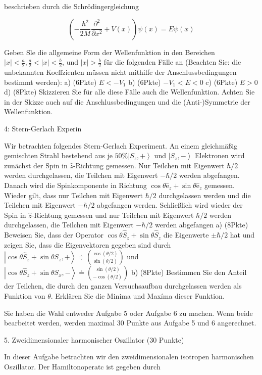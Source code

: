 \documentclass[11pt,a4paper]{article}
\begin{document}
beschrieben durch die Schrödingergleichung

$$
\left(-\frac{\hbar^2}{2 M} \frac{\partial^2}{\partial x^2}+V(x)\right) \psi(x)=E \psi(x)
$$


Geben Sle die allgemeine Form der Wellenfunktion in den Bereichen $|x|<\frac{a}{2}, \frac{a}{2}<|x|<\frac{b}{2}$, und $|x|>\frac{b}{2}$ für die folgenden Fälle an (Beachten Sie: die unbekannten Koeffzienten müssen nicht mithilfe der Anschlussbedingungen bestimmt werden):
a) (6Pkte) $E<-V_1$
b) (6Pkte) $-V_1<E<0$
c) (6Pkte) $E>0$
d) (8Pkte) Skizzieren Sie für alle diese Fälle auch die Wellenfunktion. Achten Sie in der Skizze auch auf die Anschlussbedingungen und die (Anti-)Symmetrie der Wellenfunktion.


4: Stern-Gerlach Experin

Wir betrachten folgendes Stern-Gerlach Experiment. An einem gleichmäßig gemischten Strahl bestehend aus je $50 \%\left|S_z,+\right\rangle$ und $\left|S_z,-\right\rangle$ Elektronen wird zunächst der Spin in $\hat{z}$-Richtung gemessen. Nur Teilchen mit Eigenwert $\hbar / 2$ werden durchgelassen, die Teilchen mit Eigenwert $-\hbar / 2$ werden abgefangen. Danach wird die Spinkomponente in Richtung $\cos \theta \hat{\mathrm{e}}_z+\sin \theta \hat{\mathrm{e}}_z$ gemessen. Wieder gilt, dass nur Teilchen mit Eigenwert $\hbar / 2$ durchgelassen werden und die Teilchen mit Eigenwert $-\hbar / 2$ abgefangen werden. Schließlich wird wieder der Spin in $\hat{z}$-Richtung gemessen und nur Teilchen mit Eigenwert $\hbar / 2$ werden durchgelassen, die Teilchen mit Eigenwert $-\hbar / 2$ werden abgefangen
a) (8Pkte) Beweisen Sie, dass der Operator $\cos \theta \hat{S}_z+\sin \theta \hat{S}_z$ die Eigenwerte $\pm \hbar / 2$ hat und zeigen Sie, dass die Eigenvektoren gegeben sind durch $\left|\cos \theta \hat{S}_z+\sin \theta S_z,+\right\rangle \doteqdot\binom{\cos (\theta / 2)}{\sin (\theta / 2)}$ und $\left|\cos \theta \hat{S}_z+\sin \theta S_x,-\right\rangle \doteq\binom{\sin (\theta / 2)}{-\cos (\theta / 2)}$
b) (8Pkte) Bestimmen Sie den Anteil der Teilchen, die durch den ganzen Versuchsaufbau durchgelassen werden als Funktion von $\theta$. Erklären Sie die Minima und Maxíma dieser Funktion.

Sie haben die Wahl entweder Aufgabe 5 oder Aufgabe 6 zu machen. Wenn beide bearbeitet werden, werden maximal 30 Punkte aus Aufgabe 5 und 6 angerechnet.


5. Zweidimensionaler harmonischer Oszillator (30 Punkte)

In dieser Aufgabe betrachten wir den zweidimensionalen isotropen harmonischen Oszillator. Der Hamiltonoperatc ist gegeben durch
\end{document}
